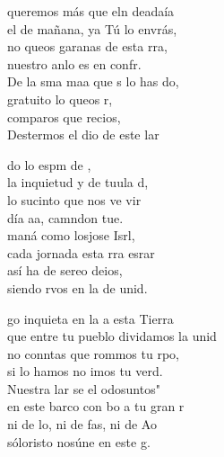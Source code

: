 \begin{cancion}%
	 queremos más que eln deadaía\\
	el de mañana, ya Tú lo envrás,\\
	no queos garanas de esta rra,\\
	nuestro anlo es en confr.\\
	\jump
	De la sma maa que s lo has do,\\
	gratuito lo queos r,\\
	comparos  que recios,\\
	Destermos el dio de este lar \jump\\
	\begin{chorus}%
		do lo espm de ,\\
		la inquietud y de tuula d,\\
		lo sucinto que nos ve vir\\
		día aa, camndon tue.\\
	\jump
		 maná como losjose Isrl,\\
		cada jornada esta rra esrar \\
		así ha de sereo deios,\\
		siendo rvos en la de  unid.\jump\\
	\end{chorus}%
	go inquieta en la a  esta Tierra\\
	que entre tu pueblo dividamos la unid\\
	no conntas que rommos tu rpo,\\
	si lo hamos no imos tu verd.\\
	\jump
	Nuestra lar se el odosuntos"\\
	en este barco con bo a tu gran r\\
	ni de lo, ni de fas, ni de Ao\\
	sóloristo nosúne en este g.\\
\end{cancion}%
